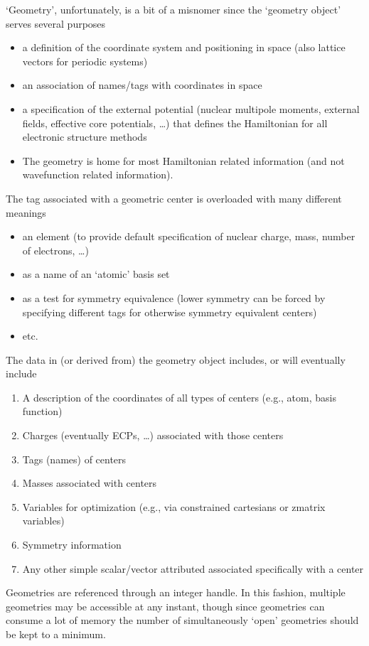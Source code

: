 
  `Geometry', unfortunately, is a bit of a misnomer since the
`geometry object' serves several purposes
\begin{itemize}
\item a definition of the coordinate system and positioning in space
  (also lattice vectors for periodic systems)
\item an association of names/tags with coordinates in space
\item a specification of the external potential (nuclear multipole
  moments, external fields, effective core potentials, \ldots) that
  defines the Hamiltonian for all electronic structure methods
\item The geometry is home for most Hamiltonian related information (and
  not wavefunction related information).
\end{itemize}

The tag associated with a geometric center is overloaded with many
different meanings
\begin{itemize}
\item an element (to provide default specification of nuclear charge,
  mass, number of electrons, \ldots)
\item as a name of an `atomic' basis set
\item as a test for symmetry equivalence (lower symmetry can be forced
     by specifying different tags for otherwise symmetry equivalent
     centers)
\item etc.
\end{itemize}

The data in (or derived from) the geometry object includes, or will
eventually include
\begin{enumerate}
\item A description of the coordinates of all types of centers (e.g.,
      atom, basis function)
\item Charges (eventually ECPs, \ldots) associated with those centers
\item Tags (names) of centers
\item Masses associated with centers
\item Variables for optimization (e.g., via constrained cartesians
      or zmatrix variables)
\item Symmetry information
\item Any other simple scalar/vector attributed associated
      specifically with a center
\end{enumerate}

Geometries are referenced through an integer handle.  In this fashion,
multiple geometries may be accessible at any instant, though since
geometries can consume a lot of memory the number of simultaneously
`open' geometries should be kept to a minimum.

